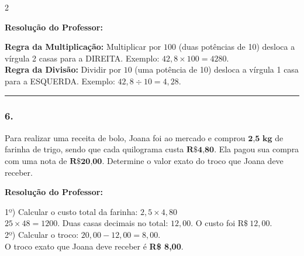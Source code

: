 \begin{multicols*}{2}
\ifgabarito
    \begin{tcolorbox}[colback=CorTitUm!5, colframe=CorTitUm, boxrule=1pt, arc=4pt, left=6pt, right=6pt, top=6pt, bottom=6pt]
    \small\textbf{\textcolor{CorTitUm}{Resolução do Professor:}}\par\vspace{0.1cm}
    \color{CinzaEscuro}
    \textbf{Regra da Multiplicação:} Multiplicar por $ 100 $ (duas potências de 10) desloca a vírgula 2 casas para a DIREITA. Exemplo: $ 42,8 \times 100 = 4280 $.\\
    \textbf{Regra da Divisão:} Dividir por $ 10 $ (uma potência de 10) desloca a vírgula 1 casa para a ESQUERDA. Exemplo: $ 42,8 \div 10 = 4,28 $.
    \end{tcolorbox}
\fi

\par\vspace{\espacoQuestao}

\noindent\textcolor{CorLinha}{\rule{\linewidth}{0.5pt}} 
\par\vspace{\espacoPreQuestao}
\subsubsection*{6.} Para realizar uma receita de bolo, Joana foi ao mercado e comprou $ \textbf{2,5 kg} $ de farinha de trigo, sendo que cada quilograma custa $ \textbf{R\$ 4,80} $. Ela pagou sua compra com uma nota de $ \textbf{R\$ 20,00} $. Determine o valor exato do troco que Joana deve receber.

\ifgabarito
    \begin{tcolorbox}[colback=CorTitUm!5, colframe=CorTitUm, boxrule=1pt, arc=4pt, left=6pt, right=6pt, top=6pt, bottom=6pt]
    \small\textbf{\textcolor{CorTitUm}{Resolução do Professor:}}\par\vspace{0.1cm}
    \color{CinzaEscuro}
    1º) Calcular o custo total da farinha: $ 2,5 \times 4,80 $\\
    $ 25 \times 48 = 1200 $. Duas casas decimais no total: $ 12,00 $. O custo foi $ \text{R\$} \ 12,00 $.\\
    2º) Calcular o troco: $ 20,00 - 12,00 = 8,00 $.\\
    O troco exato que Joana deve receber é \textbf{R\$ 8,00}.
    \end{tcolorbox}
\fi

\par\vspace{\espacoQuestao}


\end{multicols*}
